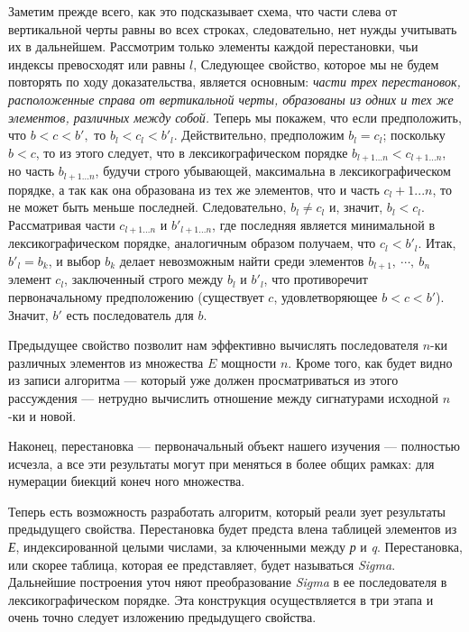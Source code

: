 {\begin{myproof}
Заметим прежде всего, как это подсказывает схема, что части  
слева от вертикальной черты равны во всех строках, следовательно, 
нет нужды учитывать их в дальнейшем. Рассмотрим только  
элементы каждой перестановки, чьи индексы превосходят или равны $l$, 
Следующее свойство, которое мы не будем повторять по ходу  
доказательства, является основным: \textit{части трех перестановок,  
расположенные справа от вертикальной черты, образованы из одних 
и тех же элементов, различных между собой.}\newline 
Теперь мы покажем, что если предположить, что $b < c < b',$ 
то $b_l < c_l < b'_l$. Действительно, предположим $b_l = c_l$;  
поскольку $b < c$, то из этого следует, что в лексикографическом порядке 
$b_{l+1...n} < c_{l+1...n}$, но часть $b_{l+1...n}$, будучи строго убывающей,  
максимальна в лексикографическом порядке, а так как она образована 
из тех же элементов, что и часть $c_l+1...n$, то не может быть меньше 
последней. Следовательно, $b_l \neq c_l$ и, значит, $b_l < c_l$.  
Рассматривая части $c_{l+1...n}$ и $b'_{l+1...n}$, где последняя является минимальной в 
лексикографическом порядке, аналогичным образом получаем, что 
$c_l < b'_l$. Итак, $b'_l = b_k$, и выбор $b_k$ делает невозможным найти среди 
элементов $b_{l+1},\: \cdots,\: b_n$ элемент $c_l$, заключенный строго между $b_l$ и 
$b'_l$, что противоречит первоначальному предположению  
(существует $c$, удовлетворяющее $b < c < b'$). Значит, $b'$ есть последователь 
для $b$. 
\end{myproof}

\begin{mynotice}
Предыдущее свойство позволит нам эффективно 
вычислять последователя $n$-ки различных элементов из  
множества $E$ мощности $n$. 
Кроме того, как будет видно из записи алгоритма — который 
уже должен просматриваться из этого рассуждения — нетрудно 
вычислить отношение между сигнатурами исходной $n$-ки и новой. 
\end{mynotice}

\begin{center}
\parbox{11cm}
{
\hspace{0.4cm} Наконец,  перестановка  —  первоначальный  объект  нашего
изучения — полностью исчезла, а все эти результаты могут при­
меняться в более общих рамках:  для нумерации биекций конеч­
ного множества.
}
\end{center}

Теперь  есть  возможность  разработать  алгоритм,  который  реали­
зует результаты предыдущего свойства. Перестановка будет предста­
влена таблицей элементов из \textit{Е},
 индексированной целыми числами, за­
ключенными между \textit{р} и \textit{q}.
 Перестановка, или скорее таблица, которая ее 
представляет, будет называться \textit{Sigma}.
  Дальнейшие построения  уточ­
няют преобразование \textit{Sigma}
 в ее  последователя в лексикографическом 
порядке.  Эта конструкция осуществляется  в три этапа и очень точно 
следует изложению предыдущего свойства.

}
